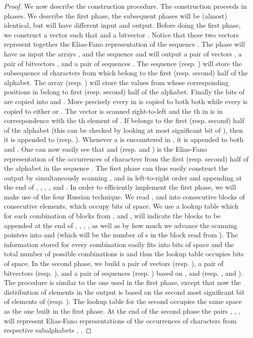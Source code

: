 \documentclass[11pt,runningheads]{llncs}
\begin{document}
{\begin{proof}
We now describe the construction procedure. The construction proceeds in 
phases. We describe the first phase, the subsequent phases will be (almost) identical, but 
will have different input and output. 
Before doing the first phase, we construct a vector 
such that  and a bitvector . Notice that these two vectors represent together the Elias-Fano representation of the sequence . 
The phase will have as input the arrays ,  and the sequence  and will output a pair of vectors , 
a pair of bitvectors , and a pair of sequences . The sequence  (resp. ) will store the subsequence 
of characters from  which belong to the first (resp. second) half of the alphabet. The array  (resp. ) will store the values from  whose corresponding positions in  belong to first (resp. second) half of the alphabet. Finally the bits of  are copied into  and . More precisely every  in  is copied to both  both  while every  is copied to either  or . The vector  is scanned right-to-left and the th  in  is in correspondence with the th element of . If  belongs to the first (resp. second) half of the alphabet (this can be checked by looking at most significant bit of ), then it is appended to  (resp. ). Whenever a  is encountered in , it is appended to both  and . One can now easily see that  and  (resp.  and ) is the Elias-Fano representation of the occurrences of characters from the first (resp. second) half of the alphabet in the sequence . The first phase can thus easily construct the output by simultaneously scanning ,  and  in left-to-right order and appending at the end of , , , ,  and . In order to efficiently implement the first phase, we will make use of the four Russian technique. We read ,  and  into consecutive blocks of  consecutive elements, which occupy  bits of space. We use a lookup table which for each combination of  blocks from ,  and , will indicate the blocks to be appended at the end of , , , ,  as well as by how much we advance the scanning pointers into  and  (which will be the number of s in the block read from ). The information stored for every combination easily fits into  bits of space and the total number of possible combinations 
is  and thus the lookup table occupies  bits of space. In the second phase, we build a pair of vectors  (resp. ), 
a pair of bitvectors  (resp. ), and a pair of sequences  (resp. ) based on ,  and  (resp. ,  and ). The procedure is similar to the one  used in the first phase, except that now the distribution of elements in the output is based on the second most significant bit of elements of  (resp. ). The lookup table for the second occupies the same space as the one built in the first phase. At the end of the second phase the pairs , , ,   will represent Elias-Fano representations of the occurrences of characters from respective subalphabets , , 

\end{proof}}
\end{document}
